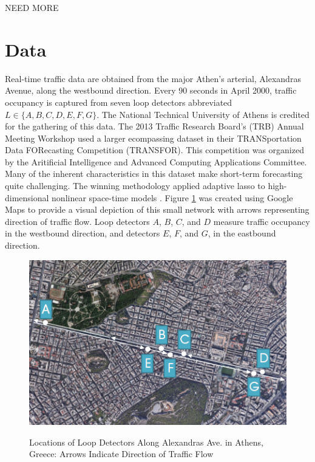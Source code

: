 \begin{center}
NEED MORE
\end{center}






\section{Data}
\label{sec:trafficdata}

Real-time traffic data are obtained from the major Athen's arterial, Alexandras Avenue, along the westbound direction. Every 90 seconds in April 2000, traffic occupancy is captured from seven loop detectors abbreviated $L \in \{A,B,C,D,E,F,G\}$. The National Technical University of Athens is credited for the gathering of this data. The 2013 Traffic Research Board's (TRB) Annual Meeting Workshop used a larger ecompassing dataset in their TRANSportation Data FORecasting Competition (TRANSFOR). This competition was organized by the Aritificial Intelligence and Advanced Computing Applications Committee.  Many of the inherent characteristics in this dataset make short-term forecasting quite challenging. The winning methodology applied adaptive lasso to high-dimensional nonlinear space-time models \citep{Kamarianakis2012}. Figure \ref{fig:trafficdatamap} was created using Google Maps to provide a visual depiction of this small network with arrows representing direction of traffic flow. Loop detectors $A$, $B$, $C$, and $D$ measure traffic occupancy in the westbound direction, and detectors $E$, $F$, and $G$, in the eastbound direction.

\begin{figure}[htbp]
\caption{Locations of Loop Detectors Along Alexandras Ave. in Athens, Greece: Arrows Indicate Direction of Traffic Flow}
\includegraphics[width=\textwidth]{TrafficMap2}
\label{fig:trafficdatamap}
\end{figure}

